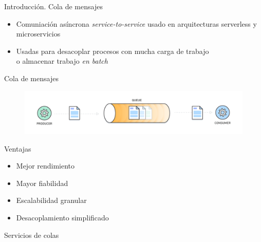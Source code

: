 \documentclass{beamer}
\begin{document}
  \begin{frame}{Introducción. Cola de mensajes}
    \begin{itemize}
      \item Comuniación asíncrona \textit{service-to-service}
      usado en arquitecturas serverless y microservicios
      \item Usadas para desacoplar procesos con mucha carga de trabajo\\
      o almacenar trabajo \textit{en batch}
    \end{itemize}
  \end{frame}

  \begin{frame}[plain]{Cola de mensajes}
    \begin{figure}
      \includegraphics[width=\textwidth]{msg_queue.png}
    \end{figure}
  \end{frame}

  \begin{frame}{Ventajas}
    \begin{itemize}
      \item Mejor rendimiento
      \item Mayor fiabilidad
      \item Escalabilidad granular
      \item Desacoplamiento simplificado
    \end{itemize}
  \end{frame}

  \begin{frame}{Servicios de colas}
  \end{frame}
\end{document}
